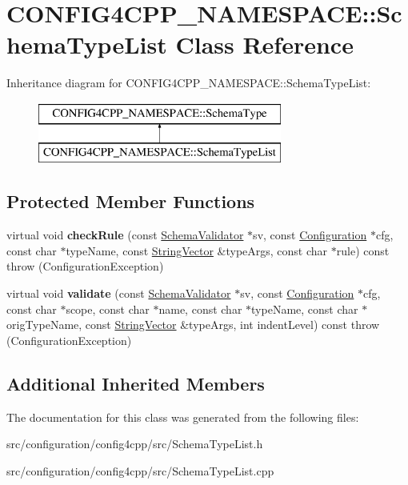 \hypertarget{classCONFIG4CPP__NAMESPACE_1_1SchemaTypeList}{\section{C\-O\-N\-F\-I\-G4\-C\-P\-P\-\_\-\-N\-A\-M\-E\-S\-P\-A\-C\-E\-:\-:Schema\-Type\-List Class Reference}
\label{classCONFIG4CPP__NAMESPACE_1_1SchemaTypeList}
}
Inheritance diagram for C\-O\-N\-F\-I\-G4\-C\-P\-P\-\_\-\-N\-A\-M\-E\-S\-P\-A\-C\-E\-:\-:Schema\-Type\-List\-:\begin{figure}[H]
\begin{center}
\leavevmode
\includegraphics[height=2.000000cm]{classCONFIG4CPP__NAMESPACE_1_1SchemaTypeList}
\end{center}
\end{figure}
\subsection*{Protected Member Functions}
\begin{DoxyCompactItemize}
\item 
\hypertarget{classCONFIG4CPP__NAMESPACE_1_1SchemaTypeList_ab0acf5bb5d7d4313fa79dd19eac29dad}{virtual void {\bfseries check\-Rule} (const \hyperlink{classCONFIG4CPP__NAMESPACE_1_1SchemaValidator}{Schema\-Validator} $\ast$sv, const \hyperlink{classCONFIG4CPP__NAMESPACE_1_1Configuration}{Configuration} $\ast$cfg, const char $\ast$type\-Name, const \hyperlink{classCONFIG4CPP__NAMESPACE_1_1StringVector}{String\-Vector} \&type\-Args, const char $\ast$rule) const   throw (\-Configuration\-Exception)}\label{classCONFIG4CPP__NAMESPACE_1_1SchemaTypeList_ab0acf5bb5d7d4313fa79dd19eac29dad}

\item 
\hypertarget{classCONFIG4CPP__NAMESPACE_1_1SchemaTypeList_aec7f2c63e9bdf39fbcb4a0ee3588229d}{virtual void {\bfseries validate} (const \hyperlink{classCONFIG4CPP__NAMESPACE_1_1SchemaValidator}{Schema\-Validator} $\ast$sv, const \hyperlink{classCONFIG4CPP__NAMESPACE_1_1Configuration}{Configuration} $\ast$cfg, const char $\ast$scope, const char $\ast$name, const char $\ast$type\-Name, const char $\ast$orig\-Type\-Name, const \hyperlink{classCONFIG4CPP__NAMESPACE_1_1StringVector}{String\-Vector} \&type\-Args, int indent\-Level) const   throw (\-Configuration\-Exception)}\label{classCONFIG4CPP__NAMESPACE_1_1SchemaTypeList_aec7f2c63e9bdf39fbcb4a0ee3588229d}

\end{DoxyCompactItemize}
\subsection*{Additional Inherited Members}


The documentation for this class was generated from the following files\-:\begin{DoxyCompactItemize}
\item 
src/configuration/config4cpp/src/Schema\-Type\-List.\-h\item 
src/configuration/config4cpp/src/Schema\-Type\-List.\-cpp\end{DoxyCompactItemize}
